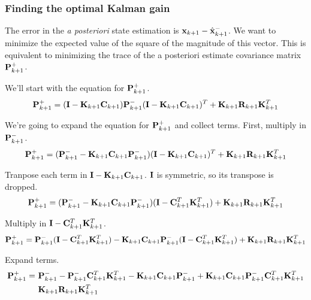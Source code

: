 \subsubsection{Finding the optimal Kalman gain}

The error in the \textit{a posteriori} \gls{state} estimation is
$\mathbf{x}_{k+1} - \hat{\mathbf{x}}_{k+1}^-$. We want to minimize the expected value
of the square of the magnitude of this vector. This is equivalent to minimizing
the trace of the a posteriori estimate covariance matrix $\mathbf{P}_{k+1}^+$.

We'll start with the equation for $\mathbf{P}_{k+1}^+$.
\begin{equation*}
  \mathbf{P}_{k+1}^+ = (\mathbf{I} - \mathbf{K}_{k+1}\mathbf{C}_{k+1})\mathbf{P}_{k+1}^-
    (\mathbf{I} - \mathbf{K}_{k+1}\mathbf{C}_{k+1})^T + \mathbf{K}_{k+1}\mathbf{R}_{k+1}
    \mathbf{K}_{k+1}^T
\end{equation*}

We're going to expand the equation for $\mathbf{P}_{k+1}^+$ and collect terms.
First, multiply in $\mathbf{P}_{k+1}^-$.
\begin{equation*}
  \mathbf{P}_{k+1}^+ =
    (\mathbf{P}_{k+1}^- - \mathbf{K}_{k+1}\mathbf{C}_{k+1}\mathbf{P}_{k+1}^-)
    (\mathbf{I} - \mathbf{K}_{k+1}\mathbf{C}_{k+1})^T + \mathbf{K}_{k+1}\mathbf{R}_{k+1}
    \mathbf{K}_{k+1}^T
\end{equation*}

Tranpose each term in $\mathbf{I} - \mathbf{K}_{k+1}\mathbf{C}_{k+1}$. $\mathbf{I}$ is
symmetric, so its transpose is dropped.
\begin{equation*}
  \mathbf{P}_{k+1}^+ =
    (\mathbf{P}_{k+1}^- - \mathbf{K}_{k+1}\mathbf{C}_{k+1}\mathbf{P}_{k+1}^-)
    (\mathbf{I} - \mathbf{C}_{k+1}^T\mathbf{K}_{k+1}^T) +
    \mathbf{K}_{k+1}\mathbf{R}_{k+1} \mathbf{K}_{k+1}^T
\end{equation*}

Multiply in $\mathbf{I} - \mathbf{C}_{k+1}^T\mathbf{K}_{k+1}^T$.
\begin{equation*}
  \mathbf{P}_{k+1}^+ =
    \mathbf{P}_{k+1}^-(\mathbf{I} - \mathbf{C}_{k+1}^T\mathbf{K}_{k+1}^T) -
    \mathbf{K}_{k+1}\mathbf{C}_{k+1}\mathbf{P}_{k+1}^-
    (\mathbf{I} - \mathbf{C}_{k+1}^T\mathbf{K}_{k+1}^T) +
    \mathbf{K}_{k+1}\mathbf{R}_{k+1} \mathbf{K}_{k+1}^T
\end{equation*}

Expand terms.
\begin{align*}
  \mathbf{P}_{k+1}^+ =~&
    \mathbf{P}_{k+1}^- - \mathbf{P}_{k+1}^-\mathbf{C}_{k+1}^T\mathbf{K}_{k+1}^T -
    \mathbf{K}_{k+1}\mathbf{C}_{k+1}\mathbf{P}_{k+1}^- +
    \mathbf{K}_{k+1}\mathbf{C}_{k+1}\mathbf{P}_{k+1}^-\mathbf{C}_{k+1}^T\mathbf{K}_{k+1}^T \\
    &\mathbf{K}_{k+1}\mathbf{R}_{k+1} \mathbf{K}_{k+1}^T
\end{align*}

